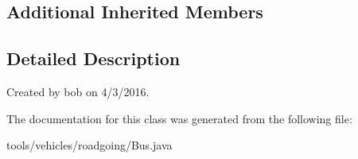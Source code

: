 \subsection*{Additional Inherited Members}


\subsection{Detailed Description}
Created by bob on 4/3/2016. 

The documentation for this class was generated from the following file\+:\begin{DoxyCompactItemize}
\item 
tools/vehicles/roadgoing/Bus.\+java\end{DoxyCompactItemize}
